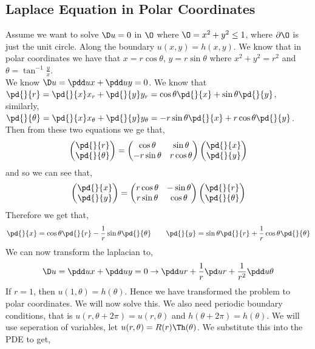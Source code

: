 \subsection{Laplace Equation in Polar Coordinates}
Assume we want to solve $\D u = 0$ in $\O$ where $\O = x^2 + y^2 \le 1$, where $\partial\O$ is just the unit circle. Along the boundary $u(x, y) = h(x, y)$. We know that in polar coordinates we have that $x = r\cos \theta$, $y = r\sin \theta$ where $x^2 + y^2 = r^2$ and $\theta = \tan^{-1}\frac{y}{x}$. \\

\noindent
We know $\D u = \pdd u x + \pdd u y = 0$. We know that $\pd{}{r} = \pd{}{x}x_r + \pd{}{y}y_r = \cos \theta \pd{}{x} + \sin \theta \pd{}{y}$, similarly, $\pd{}{\theta} = \pd{}{x}x_\theta + \pd{}{y}y_\theta = -r\sin \theta \pd{}{x} + r\cos \theta \pd{}{y}$.
Then from these two equations we ge that,
$$ \begin{pmatrix}
  \pd{}{r} \\ \pd{}{\theta}
\end{pmatrix} = \begin{pmatrix}
  \cos \theta & \sin \theta \\ -r\sin \theta & r\cos \theta
\end{pmatrix} \begin{pmatrix}
  \pd{}{x} \\ \pd{}{y}
\end{pmatrix} $$
and so we can see that,
$$ \begin{pmatrix}
  \pd{}{x} \\ \pd{}{y}
\end{pmatrix} = \begin{pmatrix}
  r\cos \theta & -\sin \theta \\ r\sin \theta & \cos \theta
\end{pmatrix}\begin{pmatrix}
  \pd{}{r} \\ \pd{}{\theta}
\end{pmatrix}  $$
Therefore we get that,
$$ \pd{}{x} = \cos \theta\pd{}{r} - \frac{1}{r}\sin \theta \pd{}{\theta} \qquad \pd{}{y} = \sin \theta \pd{}{r} + \frac{1}{r}\cos \theta \pd{}{\theta} $$
We can now transform the laplacian to,
$$ \D u = \pdd u x + \pdd u y = 0 \to \pdd u r + \frac{1}{r}\pd u r + \frac{1}{r^2}\pdd u \theta $$
If $r = 1$, then $u(1, \theta) = h(\theta)$. Hence we have transformed the problem to polar coordinates. We will now solve this. We also need periodic boundary conditions, that is $u(r, \theta + 2\pi) = u(r, \theta)$ and $h(\theta + 2\pi) = h(\theta)$. We will use seperation of variables, let $u(r, \theta) = R(r)\Th (\theta)$. We substitute this into the PDE to get,
